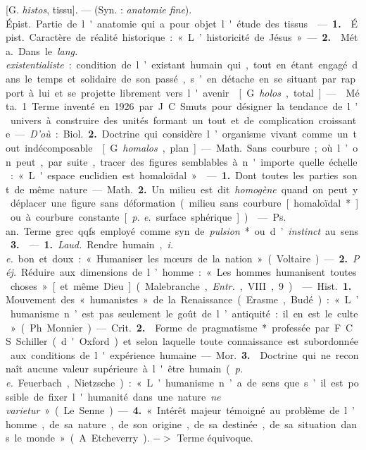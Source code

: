 \begin{itemize}[leftmargin=1cm, label=, itemsep=1pt]
 [G. {\it histos}, tissu]. — (Syn. : {\it anatomie fine}).
\si{Épist.} Partie de l'anatomie qui a pour objet l'étude des tissus.

 — {\bf 1.}  \si{Épist.} Caractère de
réalité historique : « L’historicité de
Jésus ». — {\bf 2.}  \si{Méta.} Dans le {\it lang.
existentialiste} : condition de l’existant humain qui, tout en étant
engagé dans le temps et solidaire de son passé, s’en détache en se
% 
situant par rapport à lui et se projette librement vers l'avenir.

 [G. {\it holos}, total]. —  \si{Méta.} 1. Terme
inventé en 1926 par J. C. Smuts pour désigner la tendance de l’univers à
construire des unités formant un tout et de complication croissante.
— {\it D'où} : \si{Biol.} {\bf 2.} Doctrine qui considère l’organisme vivant
comme un tout indécomposable.

 [G. {\it homalos}, plan]. — \si{Math.} Sans courbure; où l’on
peut, par suite, tracer des figures semblables à n'importe quelle échelle :
« L'espace euclidien est homaloïdal ».

 — {\bf 1.} Dont toutes les parties sont de même nature.

— \si{Math.} {\bf 2.} Un milieu est dit {\it homogène} quand on peut y
déplacer une figure sans déformation (milieu sans courbure [homaloïdal*] ou
à courbure constante [{\it p. e.} surface sphérique]).

 — \si{Ps. an.} Terme grec qqfs. employé comme syn. de
{\it pulsion}* ou d’{\it instinct} au sens {\bf 3.}

 — {\bf 1.} {\it Laud.} Rendre humain, {\it i. e.} bon et
doux : « Humaniser les mœurs de la nation » (Voltaire). — {\bf 2.} {\it Péj.}
Réduire aux dimensions de l’homme : « Les hommes humanisent toutes
choses » [et même Dieu] (Malebranche, {\it Entr.}, VIII, 9).

 — \si{Hist.} {\bf 1.} Mouvement des « humanistes » de la
Renaissance (Erasme, Budé) : « L’humanisme n’est pas seulement le goût de
l’antiquité : il en est le culte » (Ph. Monnier).

— \si{Crit.} {\bf 2.}  Forme de pragmatisme* professée par
F. C. S. Schiller (d'Oxford) et selon laquelle toute
connaissance est subordonnée aux conditions de l'expérience humaine.

— \si{Mor.} {\bf 3.}  Doctrine qui ne reconnaît aucune valeur
supérieure à l'être humain ({\it p. e.} Feuerbach, Nietzsche) : « L’humanisme
n’a de sens que s’il est possible de fixer l'humanité dans une nature {\it ne
varietur} » (Le Senne). — {\bf 4.} « Intérêt majeur témoigné au problème de
l’homme, de sa nature, de son origine, de sa destinée, de sa situation dans
le monde » (A. Etcheverry). $->$ Terme équivoque.


\end{itemize}
